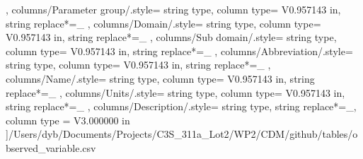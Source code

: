\begin{landscape}
{        },
    columns/Parameter group/.style={
            string type, 
            column type= V{0.957143 in}, 
            string replace*={_}{}
        },
    columns/Domain/.style={
            string type, 
            column type= V{0.957143 in}, 
            string replace*={_}{}
        },
    columns/Sub domain/.style={
            string type, 
            column type= V{0.957143 in}, 
            string replace*={_}{}
        },
    columns/Abbreviation/.style={
            string type, 
            column type= V{0.957143 in}, 
            string replace*={_}{}
        },
    columns/Name/.style={
            string type, 
            column type= V{0.957143 in}, 
            string replace*={_}{}
        },
    columns/Units/.style={
            string type, 
            column type= V{0.957143 in}, 
            string replace*={_}{}
        },
    columns/Description/.style={
            string type, 
            string replace*={_}{},
            column type = V{3.000000 in}
        }
    ]{/Users/dyb/Documents/Projects/C3S_311a_Lot2/WP2/CDM/github/tables/observed_variable.csv}
\end{landscape}
